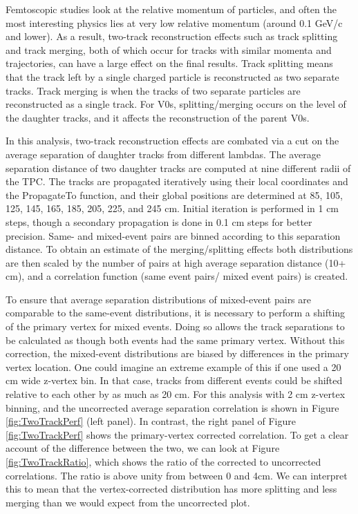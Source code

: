 Femtoscopic studies look at the relative momentum of particles, and often the most interesting physics lies at very low relative momentum (around 0.1 GeV/c and lower).  
As a result, two-track reconstruction effects such as track splitting and track merging, both of which occur for tracks with similar momenta and trajectories, can have a large effect on the final results.  
Track splitting means that the track left by a single charged particle is reconstructed as two separate tracks. 
Track merging is when the tracks of two separate particles are reconstructed as a single track.  
For V0s, splitting/merging occurs on the level of the daughter tracks, and it affects the reconstruction of the parent V0s.

In this analysis, two-track reconstruction effects are combated via a cut on the average separation of daughter tracks from different lambdas.  
The average separation distance of two daughter tracks are computed at nine different radii of the TPC.  
The tracks are propagated iteratively using their local coordinates and the PropagateTo function, and their global positions are determined at 85, 105, 125, 145, 165, 185, 205, 225, and 245 cm.  
Initial iteration is performed in 1 cm steps, though a secondary propagation is done in 0.1 cm steps for better precision.  
Same- and mixed-event pairs are binned according to this separation distance.  
To obtain an estimate of the merging/splitting effects both distributions are then scaled by the number of pairs at high average separation distance (10+ cm), and a correlation function (same event pairs/ mixed event pairs) is created. 

To ensure that average separation distributions of mixed-event pairs are comparable to the same-event distributions, it is necessary to perform a shifting of the primary vertex for mixed events.  
Doing so allows the track separations to be calculated as though both events had the same primary vertex.  
Without this correction, the mixed-event distributions are biased by differences in the primary vertex location.  
One could imagine an extreme example of this if one used a 20 cm wide z-vertex bin.  
In that case, tracks from different events could be shifted relative to each other by as much as 20 cm.  
For this analysis with 2 cm z-vertex binning, and the uncorrected average separation correlation is shown in Figure \ref{fig:TwoTrackPerf} (left panel).  
In contrast, the right panel of Figure \ref{fig:TwoTrackPerf} shows the primary-vertex corrected correlation.  
To get a clear account of the difference between the two, we can look at Figure \ref{fig:TwoTrackRatio}, which shows the ratio of the corrected to uncorrected correlations.  
The ratio is above unity from between 0 and 4cm.  
We can interpret this to mean that the vertex-corrected distribution has more splitting and less merging than we would expect from the uncorrected plot.

